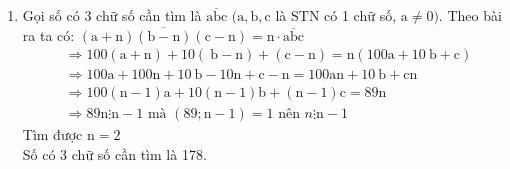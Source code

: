 \begin{bt}
{\begin{enumerate}
$$\begin{aligned}
        & B=17 \cdot 18 \cdot 19 \cdot 5=29070
        \end{aligned}
        $$
        \item Gọi số có 3 chữ số cần tìm là $\overline{\mathrm{abc}}$ $(\mathrm{a}, \mathrm{b}, \mathrm{c}$ là $\mathrm{STN}$ có 1 chữ số, $\mathrm{a} \neq 0)$.
        Theo bài ra ta có: $\overline{(\mathrm{a}+\mathrm{n})(\mathrm{b}-\mathrm{n})(\mathrm{c}-\mathrm{n})}=\mathrm{n} \cdot \overline{\mathrm{abc}}$
        $$
        \begin{aligned}
        & \Rightarrow 100(\mathrm{a}+\mathrm{n})+10(\mathrm{~b}-\mathrm{n})+(\mathrm{c}-\mathrm{n})=\mathrm{n}(100 \mathrm{a}+10 \mathrm{~b}+\mathrm{c}) \\
        & \Rightarrow 100 \mathrm{a}+100 \mathrm{n}+10 \mathrm{~b}-10 \mathrm{n}+\mathrm{c}-\mathrm{n}=100 \mathrm{an}+10 \mathrm{~b}+\mathrm{cn} \\
        & \Rightarrow 100(\mathrm{n}-1) \mathrm{a}+10(\mathrm{n}-1) \mathrm{b}+(\mathrm{n}-1) \mathrm{c}=89 \mathrm{n} \\
        & \Rightarrow 89 \mathrm{n} \vdots \mathrm{n}-1 \text { mà }(89 ; \mathrm{n}-1)=1 \text { nên } n \vdots \mathrm{n}-1
        \end{aligned}
        $$
        Tìm được $\mathrm{n}=2$ \\ 
        Số có 3 chữ số cần tìm là 178.
    \end{enumerate}
} 
\end{bt}

